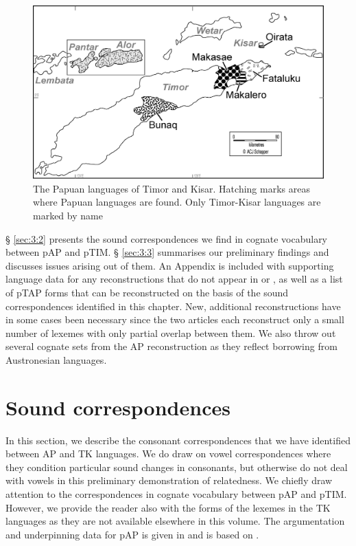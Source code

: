 \begin{figure}
\includegraphics[width=\textwidth]{figures/ch3_map.png}
\caption[The Papuan languages of Timor and Kisar]{The Papuan languages of Timor and Kisar. Hatching marks areas where Papuan languages are found. Only Timor-Kisar languages are marked by name}
\end{figure}

{\S} \ref{sec:3:2} presents the sound correspondences we find in cognate vocabulary between pAP and pTIM. {\S} \ref{sec:3:3} summarises our preliminary findings and discusses issues arising out of them. An Appendix is included with supporting language data for any reconstructions that do not appear in \citet{HoltonEtAl2012} or \citet{SchapperEtAl2012}, as well as a list of pTAP forms that can be reconstructed on the basis of the sound correspondences identified in this chapter. New, additional reconstructions have in some cases been necessary since the two articles each reconstruct only a small number of lexemes with only partial overlap between them. We also throw out several cognate sets from the AP reconstruction as they reflect borrowing from Austronesian languages. 

\section{Sound correspondences}
In this section, we describe the consonant correspondences that we have identified between AP and TK languages. We do draw on vowel correspondences where they condition particular sound changes in consonants, but otherwise do not deal with vowels in this preliminary demonstration of relatedness. We chiefly draw attention to the correspondences in cognate vocabulary between pAP and pTIM. However, we provide the reader also with the forms of the lexemes in the TK languages as they are not available elsewhere in this volume. The argumentation and underpinning data for pAP is given in \citet{HoltonRobinsonTV} and is based on \citet{HoltonEtAl2012}.

